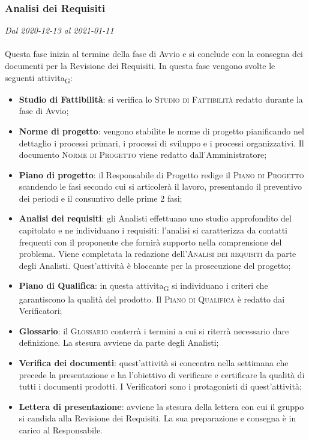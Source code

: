 \subsubsection{Analisi dei Requisiti}

\textit{Dal 2020-12-13 al 2021-01-11}
\\\\
Questa fase inizia al termine della fase di Avvio e si conclude con la consegna dei documenti per la Revisione dei Requisiti.
In questa fase vengono svolte le seguenti \gls{attivita}\textsubscript{G}:
\begin{itemize}
	\item \textbf{Studio di Fattibilità}: si verifica lo \textsc{Studio di Fattibilità} redatto durante la fase di Avvio;
	\item \textbf{Norme di progetto}: vengono stabilite le norme di progetto pianificando nel dettaglio i processi primari, i processi di sviluppo e i processi organizzativi. Il documento \textsc{Norme di Progetto} viene redatto dall'Amministratore;
	\item \textbf{Piano di progetto}: il Responsabile di Progetto redige il \textsc{Piano di Progetto} scandendo le fasi secondo cui si articolerà il lavoro, presentando il preventivo dei periodi e il consuntivo delle prime 2 fasi;
	\item \textbf{Analisi dei requisiti}: gli Analisti effettuano uno studio approfondito del capitolato e ne individuano i requisiti: l'analisi si caratterizza da contatti frequenti con il proponente che fornirà supporto nella comprensione del problema. Viene completata la redazione dell'\textsc{Analisi dei requisiti} da parte degli Analisti. Quest'attività è bloccante per la prosecuzione del progetto;
	\item \textbf{Piano di Qualifica}: in questa \gls{attivita}\textsubscript{G} si individuano i criteri che garantiscono la qualità del prodotto. Il \textsc{Piano di Qualifica} è redatto dai Verificatori;
	\item \textbf{Glossario}: il \textsc{Glossario} conterrà i termini a cui si riterrà necessario dare definizione. La stesura avviene da parte degli Analisti;
	\item \textbf{Verifica dei documenti}: quest'attività si concentra nella settimana che precede la presentazione e ha l'obiettivo di verificare e certificare la qualità di tutti i documenti prodotti. I Verificatori sono i protagonisti di quest'attività;
	\item \textbf{Lettera di presentazione}: avviene la stesura della lettera con cui il gruppo si candida alla Revisione dei Requisiti. La sua preparazione e consegna è in carico al Responsabile.
\end{itemize}

